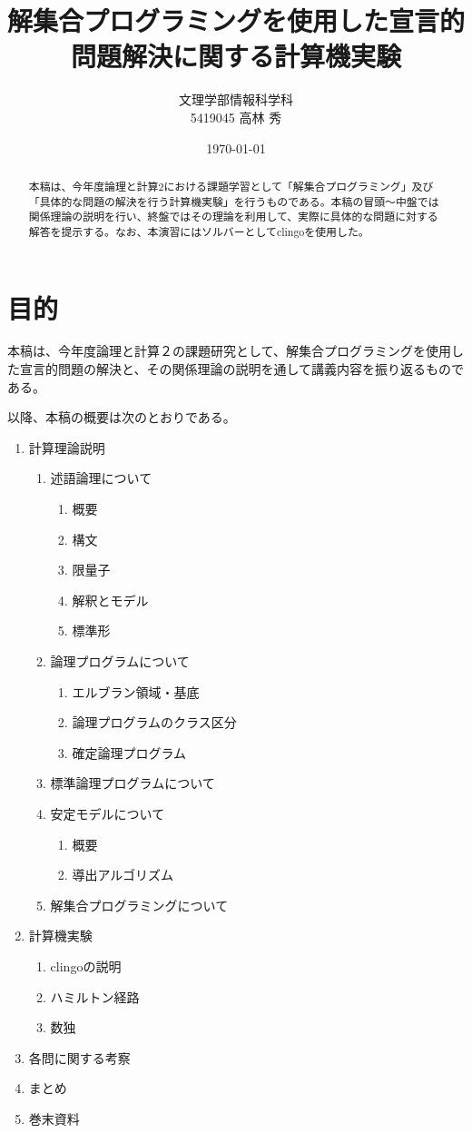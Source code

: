 \documentclass[dvipdfmx]{jsarticle}
\title{解集合プログラミングを使用した宣言的問題解決に関する計算機実験}
\author{文理学部情報科学科\\5419045 高林 秀}
\date{\today}
\begin{document}
\maketitle

\begin{abstract}
本稿は、今年度論理と計算2における課題学習として「解集合プログラミング」及び「具体的な問題の解決を行う計算機実験」を行うものである。本稿の冒頭〜中盤では関係理論の説明を行い、終盤ではその理論を利用して、実際に具体的な問題に対する解答を提示する。なお、本演習にはソルバーとしてclingoを使用した。
\end{abstract}

\section{目的}
本稿は、今年度論理と計算２の課題研究として、解集合プログラミングを使用した宣言的問題の解決と、その関係理論の説明を通して講義内容を振り返るものである。\par
以降、本稿の概要は次のとおりである。
\begin{enumerate}
  \item 計算理論説明
  \begin{enumerate}
    \item 述語論理について
    \begin{enumerate}
      \item 概要
      \item 構文
      \item 限量子
      \item 解釈とモデル
      \item 標準形
    \end{enumerate}
    \item 論理プログラムについて
    \begin{enumerate}
      \item エルブラン領域・基底
      \item 論理プログラムのクラス区分
      \item 確定論理プログラム
    \end{enumerate}
    \item 標準論理プログラムについて
    \item 安定モデルについて
    \begin{enumerate}
      \item 概要
      \item 導出アルゴリズム
    \end{enumerate}
    \item 解集合プログラミングについて
  \end{enumerate}
  \item 計算機実験
  \begin{enumerate}
    \item clingoの説明
    \item ハミルトン経路
    \item 数独
  \end{enumerate}
  \item 各問に関する考察
  \item まとめ
  \item 巻末資料
\end{enumerate}
\end{document}
